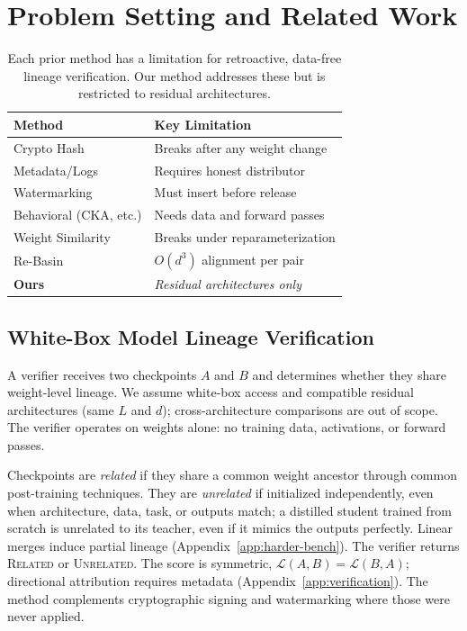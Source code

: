 \section{Problem Setting and Related Work}\label{sec:background}

\begin{table}[t]
\centering
\small
\begin{tabular}{@{}lp{4.2cm}@{}}
\toprule
Method & Key Limitation \\
\midrule
Crypto Hash & Breaks after any weight change \\
Metadata/Logs & Requires honest distributor \\
Watermarking & Must insert before release \\
Behavioral (CKA, etc.) & Needs data and forward passes \\
Weight Similarity & Breaks under reparameterization \\
Re-Basin & $O(d^3)$ alignment per pair \\
\textbf{Ours} & \emph{Residual architectures only} \\
\bottomrule
\end{tabular}
\caption{Each prior method has a limitation for retroactive, data-free lineage verification. Our method addresses these but is restricted to residual architectures.}
\label{tab:comparison}
\end{table}

\subsection{White-Box Model Lineage Verification}

A verifier receives two checkpoints $A$ and $B$ and determines whether they share weight-level lineage. We assume white-box access and compatible residual architectures (same $L$ and $d$); cross-architecture comparisons are out of scope. The verifier operates on weights alone: no training data, activations, or forward passes.

Checkpoints are \emph{related} if they share a common weight ancestor through common post-training techniques. They are \emph{unrelated} if initialized independently, even when architecture, data, task, or outputs match; a distilled student trained from scratch is unrelated to its teacher, even if it mimics the outputs perfectly. Linear merges induce partial lineage (Appendix~\ref{app:harder-bench}). The verifier returns \textsc{Related} or \textsc{Unrelated}. The score is symmetric, $\mathcal{L}(A,B) = \mathcal{L}(B,A)$; directional attribution requires metadata (Appendix~\ref{app:verification}). The method complements cryptographic signing and watermarking where those were never applied.

